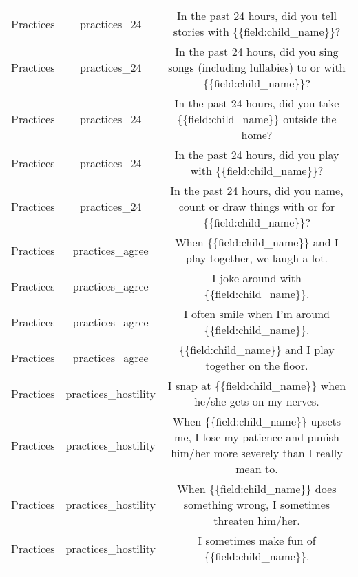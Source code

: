 \begin{table}[!htbp]
\begin{tabular}{@{\extracolsep{5pt}} ccc}
Practices & practices\_24 & In the past 24 hours, did you tell stories with \{\{field:child\_name\}\}? \\ 
Practices & practices\_24 & In the past 24 hours, did you sing songs (including lullabies) to or with \{\{field:child\_name\}\}? \\ 
Practices & practices\_24 & In the past 24 hours, did you take \{\{field:child\_name\}\} outside the home? \\ 
Practices & practices\_24 & In the past 24 hours, did you play with \{\{field:child\_name\}\}? \\ 
Practices & practices\_24 & In the past 24 hours, did you name, count or draw things with or for \{\{field:child\_name\}\}? \\ 
Practices & practices\_agree & When \{\{field:child\_name\}\} and I play together, we laugh a lot. \\ 
Practices & practices\_agree & I joke around with \{\{field:child\_name\}\}. \\ 
Practices & practices\_agree & I often smile when I'm around \{\{field:child\_name\}\}. \\ 
Practices & practices\_agree & \{\{field:child\_name\}\} and I play together on the floor. \\ 
Practices & practices\_hostility & I snap at \{\{field:child\_name\}\} when he/she gets on my nerves. \\ 
Practices & practices\_hostility & When \{\{field:child\_name\}\} upsets me, I lose my patience and punish him/her more severely than I really mean to. \\ 
Practices & practices\_hostility & When \{\{field:child\_name\}\} does something wrong, I sometimes threaten him/her. \\ 
Practices & practices\_hostility & I sometimes make fun of \{\{field:child\_name\}\}. \\ 
\hline \\[-1.8ex] 
\end{tabular} 
\end{table} 

